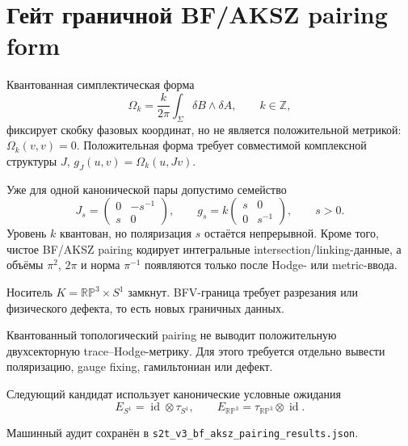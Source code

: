 \chapter{Гейт граничной BF/AKSZ pairing form}

Квантованная симплектическая форма
\begin{equation}
 \Omega_k=\frac{k}{2\pi}\int_\Sigma\delta B\wedge\delta A,
 \qquad k\in\mathbb Z,
\end{equation}
фиксирует скобку фазовых координат, но не является положительной метрикой:
\(\Omega_k(v,v)=0\). Положительная форма требует совместимой комплексной
структуры \(J\), \(g_J(u,v)=\Omega_k(u,Jv)\).

Уже для одной канонической пары допустимо семейство
\begin{equation}
 J_s=\begin{pmatrix}0&-s^{-1}\\s&0\end{pmatrix},
 \qquad
 g_s=k\begin{pmatrix}s&0\\0&s^{-1}\end{pmatrix},
 \qquad s>0.
\end{equation}
Уровень \(k\) квантован, но поляризация \(s\) остаётся непрерывной.
Кроме того, чистое BF/AKSZ pairing кодирует интегральные
intersection/linking-данные, а объёмы \(\pi^2\), \(2\pi\) и норма
\(\pi^{-1}\) появляются только после Hodge- или metric-ввода.

Носитель \(K=\mathbb{RP}^3\times S^1\) замкнут. BFV-граница требует
разрезания или физического дефекта, то есть новых граничных данных.

\begin{nogocriterion}
Квантованный топологический pairing не выводит положительную
двухсекторную trace--Hodge-метрику. Для этого требуется отдельно вывести
поляризацию, gauge fixing, гамильтониан или дефект.
\end{nogocriterion}

Следующий кандидат использует канонические условные ожидания
\begin{equation}
 E_{S^1}=\operatorname{id}\otimes\tau_{S^1},
 \qquad
 E_{\mathbb{RP}^3}=\tau_{\mathbb{RP}^3}\otimes\operatorname{id}.
\end{equation}

Машинный аудит сохранён в
\texttt{s2t\_v3\_bf\_aksz\_pairing\_results.json}.